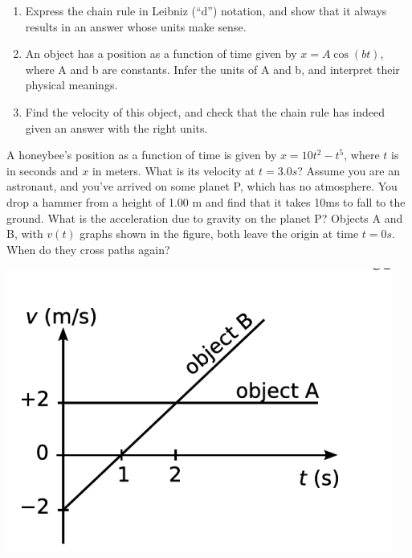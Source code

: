 \documentclass[12pt,addpoints]{exam}
\begin{document}
\begin{center}
\begin{questions}
\begin{center}
			\end{center}
			\vspace{1in}
			\question 
			\begin{enumerate}[label=(\alph*)]
				\item Express the chain rule in Leibniz
				(“d”) notation, and show that it always results
				in an answer whose units make sense.\vspace{1in}
				\item An object has a position as a function of
				time given by $x = A\cos(bt)$, where A and b
				are constants. Infer the units of A and b, and
				interpret their physical meanings.\vspace{1in}
				\item Find the velocity of this object, and check
				that the chain rule has indeed given an answer
				with the right units.\vspace{1in}
			\end{enumerate} 
			\question A honeybee’s position as a function of time is given by $x = 10t^2-t^5$, where $t$ is in seconds and $x$ in meters. What is its velocity at $t = 3.0s$?\vspace{1in}
			\question Assume you are an astronaut, and you’ve arrived on some planet P, which has no atmosphere. You drop a hammer from a height of 1.00 m and find that it takes 10ms to fall to the ground. What is the acceleration due to gravity on the planet P?\vspace{1.5in}
			\question Objects A and B, with $v(t)$ graphs shown in the figure, both leave the origin at time $t = 0 s$. When do they cross paths again?
			\begin{center}
				\includegraphics[scale=0.3]{graph2.png}

\end{center}
\end{questions}
\end{center}
\end{document}
